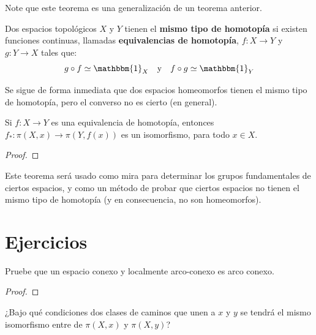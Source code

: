 \documentclass[12pt]{report}
\theoremstyle{largebreak}
\newcommand\cf[3]{\ensuremath{#1:#2\rightarrow#3}}
\newcommand{\bbm}[1]{\ensuremath{\mathbbm{#1}}}
\begin{document}
    Note que este teorema es una generalización de un teorema anterior. 

    \begin{mydef}
        Dos espacios topológicos $X$ y $Y$ tienen el \textbf{mismo tipo de homotopía} si existen funciones continuas, llamadas \textbf{equivalencias de homotopía}, $\cf{f}{X}{Y}$ y $\cf{g}{Y}{X}$ tales que:
        \begin{equation*}
            g\circ f\simeq\bbm{1}_X\quad\textup{y}\quad f\circ g\simeq\bbm{1}_Y
        \end{equation*}
    \end{mydef}

    Se sigue de forma inmediata que dos espacios homeomorfos tienen el mismo tipo de homotopía, pero el converso no es cierto (en general).

    \begin{theor}
        Si $\cf{f}{X}{Y}$ es una equivalencia de homotopía, entonces $\cf{f_*}{\pi(X,x)}{\pi(Y,f(x))}$ es un isomorfismo, para todo $x\in X$.
    \end{theor}

    \begin{proof}
    \end{proof}

    Este teorema será usado como mira para determinar los grupos fundamentales de ciertos espacios, y como un método de probar que ciertos espacios no tienen el mismo tipo de homotopía (y en consecuencia, no son homeomorfos).

    \newpage

    \section{Ejercicios}

    \begin{excer}
        Pruebe que un espacio conexo y localmente arco-conexo es arco conexo.
    \end{excer}

    \begin{proof}
        
    \end{proof}

    \begin{excer}
        ¿Bajo qué condiciones dos clases de caminos que unen a $x$ y $y$ se tendrá el mismo isomorfismo entre de $\pi(X,x)$ y $\pi(X,y)$?
    \end{excer}
\end{document}
